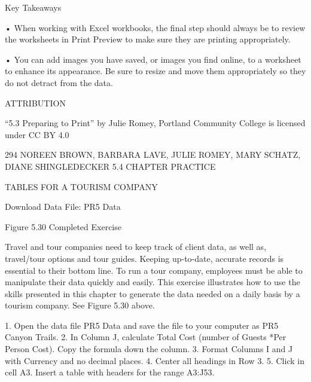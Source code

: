 Key Takeaways


• When working with Excel workbooks, the final step should always be to review the worksheets in Print
Preview to make sure they are printing appropriately.

• You can add images you have saved, or images you find online, to a worksheet to enhance its appearance. Be
sure to resize and move them appropriately so they do not detract from the data.



ATTRIBUTION

“5.3 Preparing to Print” by Julie Romey, Portland Community College is licensed under CC BY 4.0




294 NOREEN BROWN, BARBARA LAVE, JULIE ROMEY, MARY SCHATZ, DIANE SHINGLEDECKER
5.4 CHAPTER PRACTICE




TABLES FOR A TOURISM COMPANY

Download Data File: PR5 Data




Figure 5.30 Completed Exercise


Travel and tour companies need to keep track of client data, as well as, travel/tour options and tour
guides. Keeping up-to-date, accurate records is essential to their bottom line. To run a tour company,
employees must be able to manipulate their data quickly and easily. This exercise illustrates how to use
the skills presented in this chapter to generate the data needed on a daily basis by a tourism company.
See Figure 5.30 above.

1. Open the data file PR5 Data and save the file to your computer as PR5 Canyon Trails.
2. In Column J, calculate Total Cost (number of Guests *Per Person Cost). Copy the formula down
the column.
3. Format Columns I and J with Currency and no decimal places.
4. Center all headings in Row 3.
5. Click in cell A3. Insert a table with headers for the range A3:J53.

